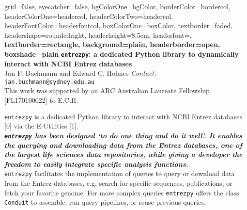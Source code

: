 \documentclass[final, a0paper, portrait]{baposter}
\newcommand{\entrezpy}{\texttt{entrezpy}\xspace}
\begin{document}

\background{
}

\begin{poster}{
    grid=false,
    eyecatcher=false,
    bgColorOne=bgColor,
    borderColor=bordercol,
    headerColorOne=headercol,
    headerColorTwo=headercol,
    headerFontColor=headerfontcol,
    boxColorOne=boxColor,
    textborder=faded,
    headershape=roundedright,
    headerheight=8.5em,
    headerfont=\large\bf,
    textborder=rectangle,
    background=plain,
    headerborder=open,
    boxshade=plain
}
{}
{
\Huge\sc\bf
   \entrezpy: a dedicated Python library to dynamically\\ interact with NCBI Entrez databases\\
}
{
    Jan P. Buchmann and Edward C. Holmes {\smaller\emph{ Contact:} \texttt{jan.buchmann@sydney.edu.au}}\\
    {\footnotesize This work was supported by an ARC Australian Laureate Fellowship [FL170100022] to E.C.H.}\\[-2em]
}

{
   \entrezpy is a dedicated Python library to interact with NCBI Entrez
   databases [0]  via the E-Utilities [1].\\[0.25em]
   \emph{\textbf{\entrezpy has been  designed ‘to do one thing and do it well’.
   It enables the querying and  downloading data from the Entrez databases, one
   of the largest life sciences data repositories, while giving a developer the
   freedom to easily integrate specific analysis functions.}}\\[0.25em]
   \entrezpy facilitates the implementation of queries to query or download data
   from the Entrez databases, e.g. search for specific sequences, publications,
   or fetch your favorite genome. For more complex queries \entrezpy offers the
   class  \texttt{Conduit} to assemble, run query pipelines, or reuse previous
   queries.

}
\end{poster}
\end{document}
